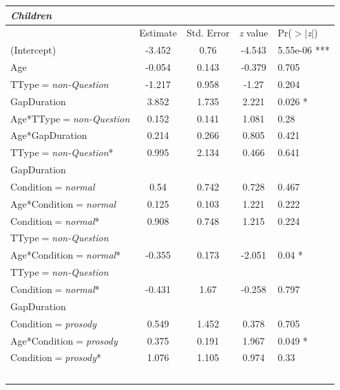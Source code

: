 \documentclass[authoryear, 12pt]{elsarticle}
\begin{document}
\linespread{1}
\begin{minipage}[t]{0.95\linewidth}
\begin{footnotesize}
\begin{longtable}{lcccl}
  \textbf{\textit{Children}} &&&& \\
    \hline
           &  Estimate & Std. Error & \textit{z} value & Pr($>$$|$\textit{z}$|$) \\    
    \hline
    (Intercept)											& -3.452		& 0.76	& -4.543	& 5.55e-06 ***	\\
    Age														& -0.054		& 0.143	& -0.379	& 0.705				\\
    TType$=$\textit{non-Question}				& -1.217		& 0.958	& -1.27		& 0.204				\\
    GapDuration											&  3.852		& 1.735	&  2.221	& 0.026 *			\\
    Age*TType$=$\textit{non-Question}		&  0.152		& 0.141	&  1.081	& 0.28				\\
    Age*GapDuration									&  0.214		& 0.266	&  0.805	& 0.421				\\
    TType$=$\textit{non-Question}*			&  0.995		& 2.134	&  0.466	& 0.641				\\
    \hspace*{5mm} GapDuration &&&& \\
	\hline
    Condition$=$\textit{normal}					&  0.54		& 0.742	&  0.728	& 0.467					\\
    Age*Condition$=$\textit{normal}			&  0.125		& 0.103	&  1.221	& 0.222				\\
    Condition$=$\textit{normal}*				&  0.908		& 0.748	&  1.215	& 0.224				\\
    \hspace*{5mm} TType$=$\textit{non-Question} &&&& \\
    Age*Condition$=$\textit{normal}*			& -0.355		& 0.173	& -2.051	& 0.04 *			\\
    \hspace*{5mm} TType$=$\textit{non-Question} &&&& \\
    Condition$=$\textit{normal}*				& -0.431		& 1.67	& -0.258	& 0.797				\\
    \hspace*{5mm} GapDuration &&&& \\
	\hline
    Condition$=$\textit{prosody}				&  0.549		& 1.452	&  0.378	& 0.705				\\
    Age*Condition$=$\textit{prosody}			&  0.375		& 0.191	&  1.967	& 0.049 *			\\
    Condition$=$\textit{prosody}*				&  1.076		& 1.105	&  0.974	& 0.33				\\
$$
\end{longtable}
\end{footnotesize}
\end{minipage}
\end{document}
